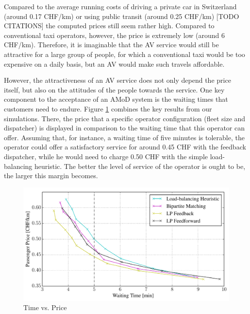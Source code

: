 Compared to the average running costs of driving a private car in Switzerland
(around 0.17 CHF/km) or using public transit (around 0.25 CHF/km) [TODO CITATIONS]
the computed prices still seem rather high. Compared to conventional taxi operators,
however, the price is extremely low (around 6 CHF/km). Therefore, it is imaginable
that the AV service would still be attractive for a large group of people, for
which a conventional taxi would be too expensive on a daily basis, but an AV would
make such travels affordable.

However, the attractiveness of an AV service does not only depend the price itself,
but also on the attitudes of the people towards the service. One key component to
the acceptance of an AMoD system is the waiting times that customers need to endure.
Figure \ref{fig:time_vs_price} combines the key results from our simulations. There,
the price that a specific operator configuration (fleet size and dispatcher) is
displayed in comparison to the waiting time that this operator can offer.
Assuming that, for instance, a waiting time of five minutes is tolerable, the
operator could offer a satisfactory service for around 0.45 CHF with the feedback
dispatcher, while he would need to charge 0.50 CHF with the simple load-balancing
heuristic. The better the level of service of the operator is ought to be, the larger
this margin becomes.

\begin{figure}
\includegraphics[width=1.0\textwidth]{figures/time_vs_price.pdf}
\caption{Time vs. Price}
\label{fig:time_vs_price}
\end{figure}
